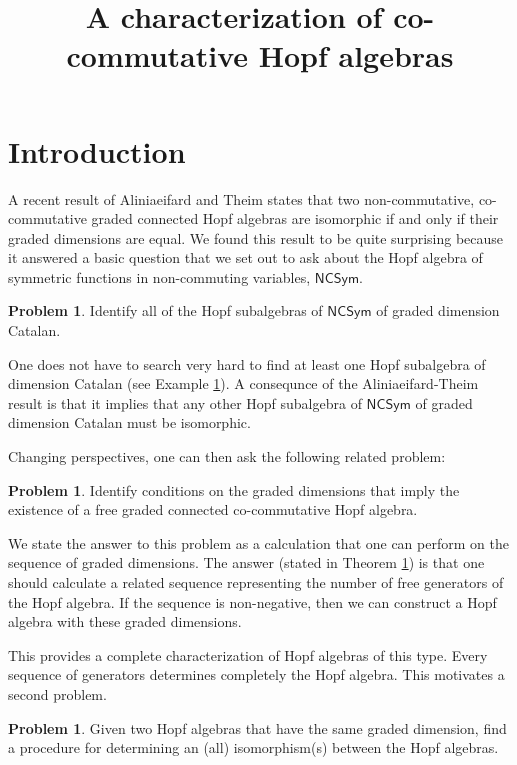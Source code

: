 \documentclass[11pt]{amsart}
\title{A characterization of co-commutative Hopf algebras}
\author{}
\theoremstyle{definition}
\newtheorem{problem}[theorem]{Problem}
\numberwithin{equation}{section}
\begin{document}
\maketitle

\section{Introduction}

A recent result of Aliniaeifard and Theim \cite{AT22}
states that two non-commutative, co-commutative
graded connected Hopf algebras are isomorphic if
and only if their graded dimensions are equal.
We found this result to be quite surprising because
it answered a basic question that we set out
to ask about the Hopf algebra of symmetric functions
in non-commuting variables, $\mathsf{NCSym}$.

\begin{problem}
Identify all of the Hopf subalgebras of $\mathsf{NCSym}$ of graded dimension Catalan.
\end{problem}

One does not have to search very hard to find at least
one Hopf subalgebra of dimension
Catalan (see Example \ref{}).
A consequnce of the Aliniaeifard-Theim
result is that it implies that any other
Hopf subalgebra of $\mathsf{NCSym}$ of
graded dimension Catalan must be isomorphic.

Changing perspectives, one can then ask the following related problem:
\begin{problem}
Identify conditions on the graded dimensions that imply the existence of
a free graded connected co-commutative Hopf algebra.
\end{problem}

We state the answer to this problem
as a calculation that one can perform on the
sequence of graded dimensions.
The answer (stated in Theorem \ref{}) is that one should calculate a
related sequence representing the number of free generators
of the Hopf algebra.
If the sequence is non-negative, then we can
construct a Hopf algebra with these graded dimensions.

This provides a complete characterization of Hopf algebras
of this type.  Every sequence of generators determines
completely the Hopf algebra.
This motivates a second problem.
\begin{problem}
Given two Hopf algebras that
have the same graded dimension, find a procedure for
determining an (all) isomorphism(s) between the Hopf
algebras.
\end{problem}
\end{document}
